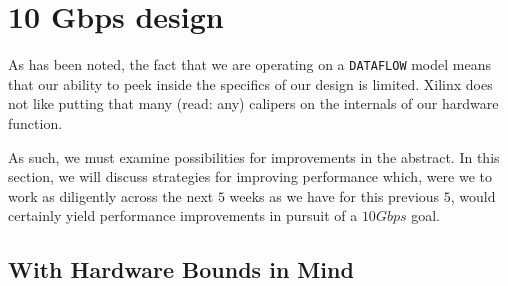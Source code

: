 \documentclass{article}
\begin{document}
\section{10 Gbps design}

As has been noted, the fact that we are operating on a \texttt{DATAFLOW} model means that our ability to peek inside the specifics of our design is limited. Xilinx does not like putting that many (read: any) calipers on the internals of our hardware function.
\par
As such, we must examine possibilities for improvements in the abstract. In this section, we will discuss strategies for improving performance which, were we to work as diligently across the next $5$ weeks as we have for this previous $5$, would certainly yield performance improvements in pursuit of a $10Gbps$ goal.

\subsection{With Hardware Bounds in Mind}
\end{document}

